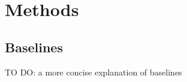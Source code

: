 \documentclass{article}
\begin{document}
\section{Methods}

\subsection{Baselines}

TO DO: a more concise explanation of baselines





\end{document}
